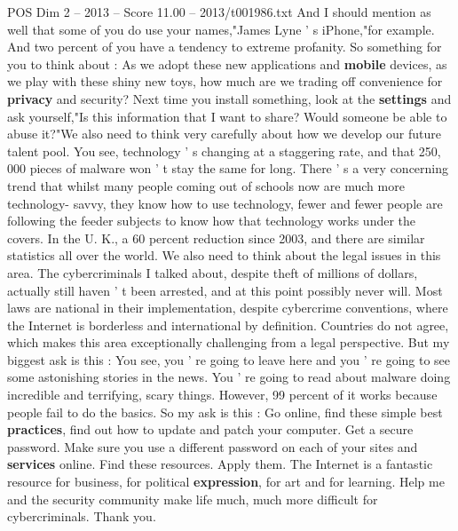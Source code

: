 \begin{textsample}{POS Dim 2 – 2013 – Score 11.00 – 2013/t001986.txt}
And I should mention as well that some of you do use your names,"James Lyne ' s iPhone,"for example.
And two percent of you have a tendency to extreme profanity.
So something for you to think about : As we adopt these new applications and \textbf{mobile} devices, as we play with these shiny new toys, how much are we trading off convenience for \textbf{privacy} and security?
Next time you install something, look at the \textbf{settings} and ask yourself,"Is this information that I want to share?
Would someone be able to abuse it?"We also need to think very carefully about how we develop our future talent pool.
You see, technology ' s changing at a staggering rate, and that 250, 000 pieces of malware won ' t stay the same for long.
There ' s a very concerning trend that whilst many people coming out of schools now are much more technology- savvy, they know how to use technology, fewer and fewer people are following the feeder subjects to know how that technology works under the covers.
In the U.
K., a 60 percent reduction since 2003, and there are similar statistics all over the world.
We also need to think about the legal issues in this area.
The cybercriminals I talked about, despite theft of millions of dollars, actually still haven ' t been arrested, and at this point possibly never will.
Most laws are national in their implementation, despite cybercrime conventions, where the Internet is borderless and international by definition.
Countries do not agree, which makes this area exceptionally challenging from a legal perspective.
But my biggest ask is this : You see, you ' re going to leave here and you ' re going to see some astonishing stories in the news.
You ' re going to read about malware doing incredible and terrifying, scary things.
However, 99 percent of it works because people fail to do the basics.
So my ask is this : Go online, find these simple best \textbf{practices}, find out how to update and patch your computer.
Get a secure password.
Make sure you use a different password on each of your sites and \textbf{services} online.
Find these resources.
Apply them.
The Internet is a fantastic resource for business, for political \textbf{expression}, for art and for learning.
Help me and the security community make life much, much more difficult for cybercriminals.
Thank you.

\end{textsample}

